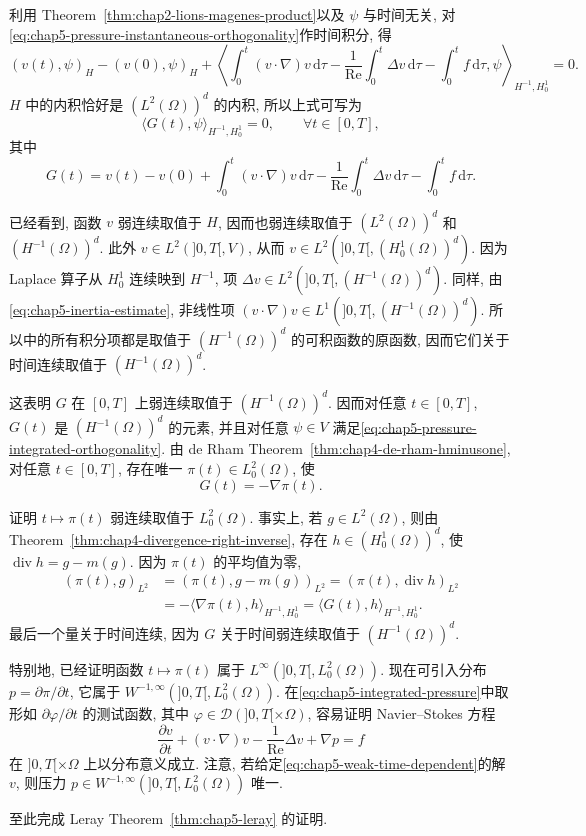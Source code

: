 利用 Theorem~\ref{thm:chap2-lions-magenes-product}以及 $\psi$ 与时间无关, 对\eqref{eq:chap5-pressure-instantaneous-orthogonality}作时间积分, 得
\[
 (v(t),\psi)_H-(v(0),\psi)_H
 +\left\langle
 \int_0^t(v\cdot\nabla)v\,\mathrm d\tau
 -\frac1{\operatorname{Re}}\int_0^t\Delta v\,\mathrm d\tau
 -\int_0^tf\,\mathrm d\tau,\psi
 \right\rangle_{H^{-1},H_0^1}=0.
\]
$H$ 中的内积恰好是 $(L^2(\Omega))^d$ 的内积, 所以上式可写为
\begin{equation}
 \langle G(t),\psi\rangle_{H^{-1},H_0^1}=0,
 \qquad\forall t\in[0,T],
\label{eq:chap5-pressure-integrated-orthogonality}
\end{equation}
其中
\[
 G(t)=v(t)-v(0)
 +\int_0^t(v\cdot\nabla)v\,\mathrm d\tau
 -\frac1{\operatorname{Re}}\int_0^t\Delta v\,\mathrm d\tau
 -\int_0^tf\,\mathrm d\tau.
\]

已经看到, 函数 $v$ 弱连续取值于 $H$, 因而也弱连续取值于 $(L^2(\Omega))^d$ 和 $(H^{-1}(\Omega))^d$. 此外 $v\in L^2(]0,T[,V)$, 从而 $v\in L^2(]0,T[,(H_0^1(\Omega))^d)$. 因为 Laplace 算子从 $H_0^1$ 连续映到 $H^{-1}$, 项 $\Delta v\in L^2(]0,T[,(H^{-1}(\Omega))^d)$. 同样, 由\eqref{eq:chap5-inertia-estimate}, 非线性项 $(v\cdot\nabla)v\in L^1(]0,T[,(H^{-1}(\Omega))^d)$. 所以中的所有积分项都是取值于 $(H^{-1}(\Omega))^d$ 的可积函数的原函数, 因而它们关于时间连续取值于 $(H^{-1}(\Omega))^d$.

这表明 $G$ 在 $[0,T]$ 上弱连续取值于 $(H^{-1}(\Omega))^d$. 因而对任意 $t\in[0,T]$, $G(t)$ 是 $(H^{-1}(\Omega))^d$ 的元素, 并且对任意 $\psi\in V$ 满足\eqref{eq:chap5-pressure-integrated-orthogonality}. 由 de Rham Theorem~\ref{thm:chap4-de-rham-hminusone}, 对任意 $t\in[0,T]$, 存在唯一 $\pi(t)\in L_0^2(\Omega)$, 使
\begin{equation}
 G(t)=-\nabla\pi(t).
\label{eq:chap5-integrated-pressure}
\end{equation}

证明 $t\mapsto\pi(t)$ 弱连续取值于 $L_0^2(\Omega)$. 事实上, 若 $g\in L^2(\Omega)$, 则由 Theorem~\ref{thm:chap4-divergence-right-inverse}, 存在 $h\in(H_0^1(\Omega))^d$, 使 $\operatorname{div}h=g-m(g)$. 因为 $\pi(t)$ 的平均值为零,
\begin{align*}
 (\pi(t),g)_{L^2}
 &=(\pi(t),g-m(g))_{L^2}
 =(\pi(t),\operatorname{div}h)_{L^2}\\
 &=-\langle\nabla\pi(t),h\rangle_{H^{-1},H_0^1}
 =\langle G(t),h\rangle_{H^{-1},H_0^1}.
\end{align*}
最后一个量关于时间连续, 因为 $G$ 关于时间弱连续取值于 $(H^{-1}(\Omega))^d$.

特别地, 已经证明函数 $t\mapsto\pi(t)$ 属于 $L^\infty(]0,T[,L_0^2(\Omega))$. 现在可引入分布 $p=\partial\pi/\partial t$, 它属于 $W^{-1,\infty}(]0,T[,L_0^2(\Omega))$. 在\eqref{eq:chap5-integrated-pressure}中取形如 $\partial\varphi/\partial t$ 的测试函数, 其中 $\varphi\in\mathcal D(]0,T[\times\Omega)$, 容易证明 Navier--Stokes 方程
\[
 \frac{\partial v}{\partial t}+(v\cdot\nabla)v
 -\frac1{\operatorname{Re}}\Delta v+\nabla p=f
\]
在 $]0,T[\times\Omega$ 上以分布意义成立. 注意, 若给定\eqref{eq:chap5-weak-time-dependent}的解 $v$, 则压力 $p\in W^{-1,\infty}(]0,T[,L_0^2(\Omega))$ 唯一.

至此完成 Leray Theorem~\ref{thm:chap5-leray} 的证明.
